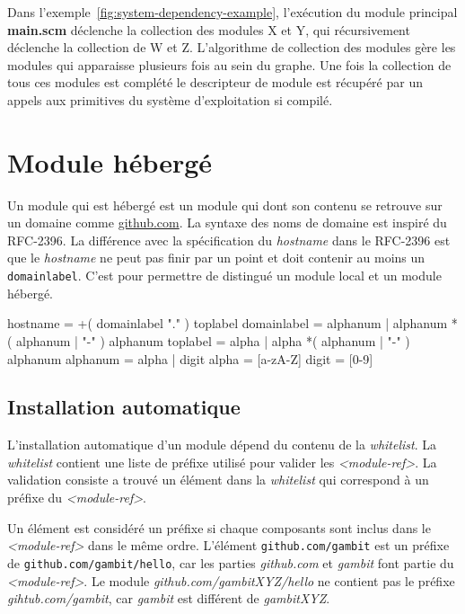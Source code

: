 Dans l'exemple~\ref{fig:system-dependency-example}, l'exécution du module principal
\textbf{main.scm} déclenche la collection des modules X et Y, qui récursivement
déclenche la collection de W et Z.  L'algorithme de collection des modules gère
les modules qui apparaisse plusieurs fois au sein du graphe.  Une fois la
collection de tous ces modules est complété le descripteur de module est
récupéré par un appels aux primitives du système d'exploitation si compilé.

\section{Module hébergé}

Un module qui est hébergé est un module qui dont son contenu
se retrouve sur un domaine comme \url{github.com}. La syntaxe
des noms de domaine est inspiré du RFC-2396.
La différence avec la spécification du \textit{hostname} dans le RFC-2396
est que le \textit{hostname} ne peut pas finir par un point et doit contenir
au moins un \verb|domainlabel|. C'est pour permettre de distingué
un module local et un module hébergé. \\

\begin{center}
  \begin{mplisting}{0.9}
hostname      = +( domainlabel "." ) toplabel
domainlabel   = alphanum | alphanum *( alphanum | "-" ) alphanum
toplabel      = alpha | alpha *( alphanum | "-" ) alphanum
alphanum      = alpha | digit
alpha         = [a-zA-Z]
digit         = [0-9]
\end{mplisting}
  \label{lst:hostname->grammar}
\end{center}


\subsection{Installation automatique}
%
L'installation automatique d'un module dépend du contenu de la
\textit{whitelist}.  La \textit{whitelist} contient une liste de préfixe
utilisé pour valider les \textit{<module-ref>}. La validation consiste
a trouvé un élément dans la \textit{whitelist} qui correspond à un
préfixe du \textit{<module-ref>}.

Un élément est considéré un préfixe si chaque composants sont inclus dans le
\textit{<module-ref>} dans le même ordre. L'élément \texttt{github.com/gambit}
est un préfixe de \texttt{github.com/gambit/hello}, car les parties
\textit{github.com} et \textit{gambit} font partie du \textit{<module-ref>}. Le
module \textit{github.com/gambitXYZ/hello} ne contient pas le préfixe
\textit{gihtub.com/gambit}, car \textit{gambit} est différent de
\textit{gambitXYZ}.


